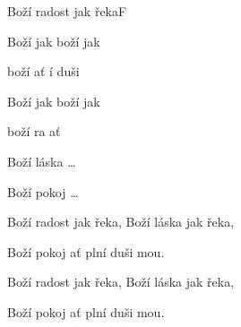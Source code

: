\setcounter{page}{104}
\begin{song}{Boží radost jak řeka}{F}{}
\begin{SBVerse}
Boží  jak  boží  jak 

boží  ať í duši 

Boží  jak  boží  jak 

boží ra ať   
\end{SBVerse}
\begin{SBVerse}
Boží láska \dots
\end{SBVerse}
\begin{SBVerse}
Boží pokoj \dots
\end{SBVerse}
\begin{SBVerse}
Boží radost jak řeka, Boží láska jak řeka,

Boží pokoj ať plní duši mou.

Boží radost jak řeka, Boží láska jak řeka,

Boží pokoj ať plní duši mou.
\end{SBVerse}
\end{song}
\pagebreak
